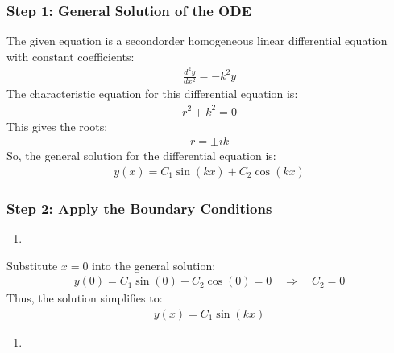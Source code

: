 \documentclass[letterpaper,10pt,english]{jupyterBook}
\begin{document}
\subsubsection{Step 1: General Solution of the ODE}
\label{\detokenize{prerequisites:step-1-general-solution-of-the-ode}}
\sphinxAtStartPar
The given equation is a second\sphinxhyphen{}order homogeneous linear differential equation with constant coefficients:
\begin{equation*}
\begin{split}
\frac{d^2 y}{dx^2} = -k^2 y
\end{split}
\end{equation*}
\sphinxAtStartPar
The characteristic equation for this differential equation is:
\begin{equation*}
\begin{split}
r^2 + k^2 = 0
\end{split}
\end{equation*}
\sphinxAtStartPar
This gives the roots:
\begin{equation*}
\begin{split}
r = \pm ik
\end{split}
\end{equation*}
\sphinxAtStartPar
So, the general solution for the differential equation is:
\begin{equation*}
\begin{split}
y(x) = C_1 \sin(kx) + C_2 \cos(kx)
\end{split}
\end{equation*}

\subsubsection{Step 2: Apply the Boundary Conditions}
\label{\detokenize{prerequisites:step-2-apply-the-boundary-conditions}}\begin{enumerate}
%
\item {} 
\sphinxAtStartPar
{}

\end{enumerate}

\sphinxAtStartPar
Substitute \(x = 0\) into the general solution:
\begin{equation*}
\begin{split}
y(0) = C_1 \sin(0) + C_2 \cos(0) = 0 \quad \Rightarrow \quad C_2 = 0
\end{split}
\end{equation*}
\sphinxAtStartPar
Thus, the solution simplifies to:
\begin{equation*}
\begin{split}
y(x) = C_1 \sin(kx)
\end{split}
\end{equation*}\begin{enumerate}
%
\setcounter{enumi}{1}
\item {} 
\sphinxAtStartPar
{}

\end{enumerate}
\end{document}
